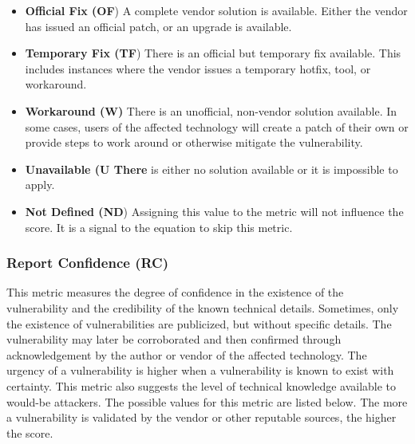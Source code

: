   \begin{itemize}
  \item
    \textbf{Official Fix (OF}) A complete vendor solution is available.
    Either the vendor has issued an official patch, or an upgrade is
    available.
  \item
    \textbf{Temporary Fix (TF}) There is an official but temporary fix
    available. This includes instances where the vendor issues a temporary
    hotfix, tool, or workaround.
  \item
    \textbf{Workaround (W)} There is an unofficial, non-vendor solution
    available. In some cases, users of the affected technology will create
    a patch of their own or provide steps to work around or otherwise
    mitigate the vulnerability.
  \item
    \textbf{Unavailable (U There} is either no solution available or it is
    impossible to apply.
  \item
    \textbf{Not Defined (ND}) Assigning this value to the metric will not
    influence the score. It is a signal to the equation to skip this
    metric.
  \end{itemize}

  \subsubsection{Report Confidence (RC)}\label{report-confidence-rc}

  This metric measures the degree of confidence in the existence of the
  vulnerability and the credibility of the known technical details.
  Sometimes, only the existence of vulnerabilities are publicized, but
  without specific details. The vulnerability may later be corroborated
  and then confirmed through acknowledgement by the author or vendor of
  the affected technology. The urgency of a vulnerability is higher when a
  vulnerability is known to exist with certainty. This metric also
  suggests the level of technical knowledge available to would-be
  attackers. The possible values for this metric are listed below.
  The more a vulnerability is validated by the vendor or other reputable
  sources, the higher the score.

